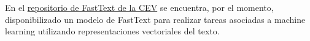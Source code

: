 \documentclass[
  spanish,
]{article}
\begin{document}
En el \href{https://gitlab.com/nlp-comision/fasttext-models}{repositorio
de FastText de la CEV} se encuentra, por el momento, disponibilizado un
modelo de FastText para realizar tareas asociadas a machine learning
utilizando representaciones vectoriales del texto.

  
\end{document}
